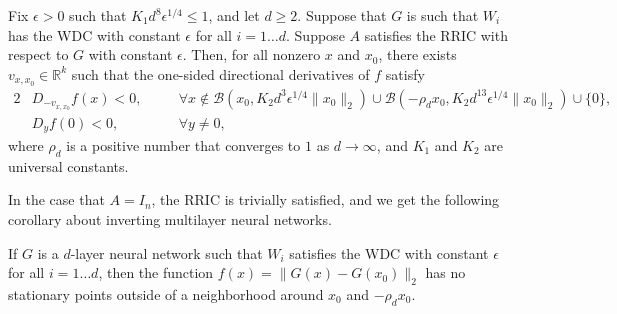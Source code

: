 \documentclass[final,12pt]{colt2018}
\newcommand{\R}{\mathbb{R}}
\newcommand{\calB}{\mathcal{B}}
\newcommand{\eps}{\epsilon}
\newcommand{\zetacheck}{\rho}
\newcommand{\xo}{x_0}
\newcommand{\vxxo}{v_{x, \xo}}
\begin{document}
\begin{theorem} \label{thm-multi-layer-deterministic}
Fix $\eps >0$ such that $K_1 d^8 \eps^{1/4} \leq 1$, and let $d \geq 2$.  Suppose that $G$ is such that $W_i$ has the  WDC with constant $\eps$ for all $i = 1 \ldots d$.  Suppose $A$ satisfies the RRIC with respect to $G$ with constant $\eps$.  Then, for all nonzero $x$ and $\xo$, there exists $\vxxo \in \R^k$ such that the one-sided directional derivatives of $f$ satisfy
\begin{alignat*}{2}
&D_{-\vxxo} f(x) <0, \quad & & \forall x  \not\in  \calB(\xo, K_2 d^{3} \eps^{1/4} \|\xo\|_2) \cup \calB(-\zetacheck_d \xo, K_2 d^{13} \eps^{1/4} \|\xo\|_2) \cup \{0\},\\
&D_y f(0) < 0, & &\forall y \neq 0,
\end{alignat*}
where $\rho_d$ is a positive number that converges to $1$ as $d \to \infty$,  and $K_1$ and $K_2$ are universal constants.
\end{theorem}

In the case that $A = I_n$, the RRIC is trivially satisfied, and we get the following corollary about inverting multilayer neural networks.
\begin{corollary}
If $G$ is a $d$-layer neural network such that $W_i$ satisfies the WDC with constant $\eps$ for all $i = 1 \ldots d$, then the function $f(x) = \|G(x) - G(\xo)\|_2$ has no stationary points outside of a neighborhood around $\xo$ and $-\rho_d \xo$. 
\end{corollary}
\end{document}
